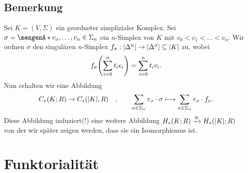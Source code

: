 \begin{enumerate}[1)]
%
\end{enumerate}

\subsection[Bemerkung: Vorgehen, um später zu zeigen: $H_*(K;R) \cong H_*(\abs*{K};R )$]{Bemerkung} %
\label{sub:511}
Sei $K=(V,\Sigma)$ ein geordneter simplizialer Komplex. Sei $\sigma= \set{v_o, \ldots , v_n} \in \Sigma_n $ ein $n$-Simplex von $K$ mit $v_0 < v_1 < \ldots < v_n$. Wir
ordnen $\sigma$ den singulären $n$-Simplex $f_\sigma : \abs*{\Delta^n} \to \abs*{\Delta^\sigma} \subseteq \abs*{K}$ zu, wobei
\begin{align*}
	f_\sigma \enbrace*{\sum_{i=0}^{n} t_i e_i} = \sum_{i=0}^{n} t_i v_i. 
\end{align*}
Nun erhalten wir eine Abbildung 
\[
	C_*(K;R) \to C_*(\abs*{K},R) \quad , \qquad   \sum_{\sigma \in \Sigma_n} r_\sigma \cdot \sigma \longmapsto \sum_{\sigma \in \Sigma_n} r_\sigma \cdot f_\sigma.
\]
Diese Abbildung induziert(!) eine weitere Abbildung $H_*(K;R) \xrightarrow{\cong} H_*(\abs*{K};R )$ von der wir später zeigen werden, dass sie ein Isomorphismus ist.
\newpage

\section{Funktorialität} %
\label{sec:6}


